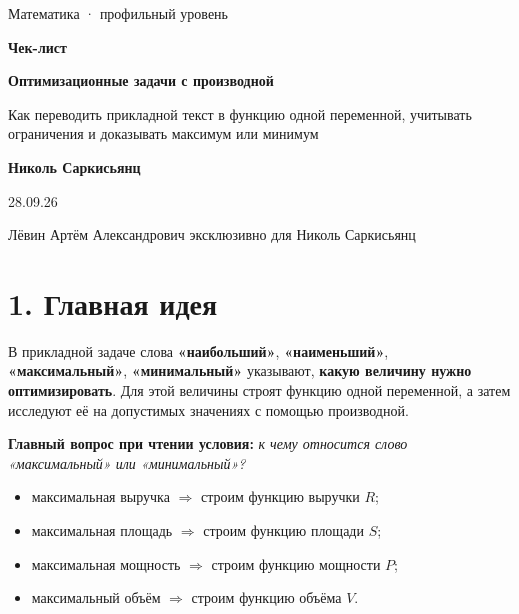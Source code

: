\documentclass[a4paper,12pt]{article}
\newcommand{\sectionline}{\vspace{1mm}{\color{accent}\hrule height 0.7pt}\vspace{3mm}}
\newcommand{\key}[1]{\textbf{\color{darkaccent}#1}}
\begin{document}
\thispagestyle{empty}
\begin{center}
\vspace*{20mm}
{\Large\color{muted}Математика · профильный уровень}\par
\vspace{11mm}
{\fontsize{30}{34}\selectfont\bfseries\color{darkaccent}Чек-лист}\par
\vspace{4mm}
{\LARGE\bfseries Оптимизационные задачи с производной}\par
\vspace{10mm}
{\large Как переводить прикладной текст в функцию одной переменной, учитывать ограничения и доказывать максимум или минимум}\par
\vspace{18mm}
{\Large\bfseries Николь Саркисьянц}\par
\vspace{5mm}
{\large 28.09.26}\par
\vfill
{\small\color{textgray}Лёвин Артём Александрович эксклюзивно для Николь Саркисьянц}\par
\vspace{8mm}
\end{center}
\clearpage

\section*{1. Главная идея}
\sectionline
В прикладной задаче слова \key{«наибольший»}, \key{«наименьший»}, \key{«максимальный»}, \key{«минимальный»} указывают, \textbf{какую величину нужно оптимизировать}. Для этой величины строят функцию одной переменной, а затем исследуют её на допустимых значениях с помощью производной.

\key{Главный вопрос при чтении условия:} \emph{к чему относится слово «максимальный» или «минимальный»?}

\begin{itemize}
  \item максимальная выручка $\Rightarrow$ строим функцию выручки $R$;
  \item максимальная площадь $\Rightarrow$ строим функцию площади $S$;
  \item максимальная мощность $\Rightarrow$ строим функцию мощности $P$;
  \item максимальный объём $\Rightarrow$ строим функцию объёма $V$.
\end{itemize}
\end{document}
